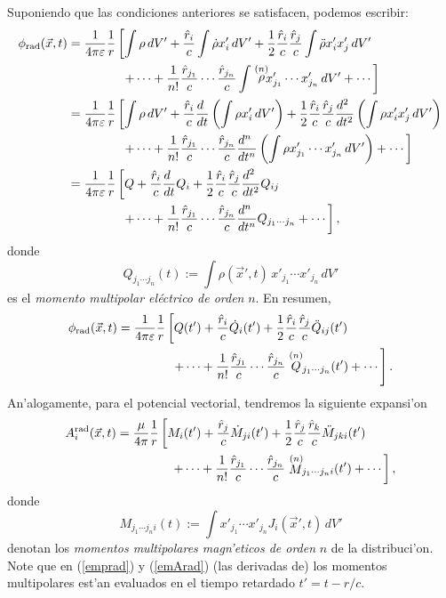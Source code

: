 Suponiendo que las condiciones anteriores se satisfacen, podemos escribir:
\begin{align}
\phi_{\rm rad}(\vec{x},t)
 &= \frac{1}{4\pi\varepsilon}\frac{1}{r}\left[  \int\rho\,dV'+\frac{\hat{r}_i}{c}\int\dot{\rho}x'_i\,dV'+\frac{1}{2}\frac{\hat{r}_i}{c}\frac{\hat{r}_j}{c}\int\ddot{\rho}x'_ix'_j\,dV'\right. \nonumber \\
 &\qquad\qquad\  \left.+\cdots +
\frac{1}{n!}\frac{\hat{r}_{j_1}}{c}\cdots\frac{\hat{r}_{j_n}}{c}\int\stackrel{(n)}{\rho}\!\!\!x'_{j_1}\cdots x'_{j_n}\,dV'+\cdots\right] \\
 &= \frac{1}{4\pi\varepsilon}\frac{1}{r}\left[  \int\rho\,dV'+\frac{\hat{r}_i}{c}\frac{d\ }{dt}\left(\int\rho x'_i\,dV'\right)+\frac{1}{2}\frac{\hat{r}_i}{c}\frac{\hat{r}_j}{c}\frac{d^2\ }{dt^2}\left(\int\rho x'_ix'_j\,dV'\right)\right. \nonumber \\
 &\qquad\qquad\ \left.+\cdots +
\frac{1}{n!}\frac{\hat{r}_{j_1}}{c}\cdots\frac{\hat{r}_{j_n}}{c}\frac{d^n\ }{dt^n}\left(\int\rho x'_{j_1}\cdots x'_{j_n}\,dV'\right) +\cdots\right] \\
 &= \frac{1}{4\pi\varepsilon}\frac{1}{r}\left[  Q+\frac{\hat{r}_i}{c}\frac{d\ }{dt}Q_i+\frac{1}{2}\frac{\hat{r}_i}{c}\frac{\hat{r}_j}{c}\frac{d^2\ }{dt^2}Q_{ij}\right. \nonumber \\
 &\qquad\qquad\ \left.+\cdots +\frac{1}{n!}\frac{\hat{r}_{j_1}}{c}\cdots\frac{\hat{r}_{j_n}}{c}\frac{d^n\ }{dt^n}Q_{j_1\cdots j_n} +\cdots\right] ,
\end{align}
donde
\begin{equation}
 Q_{j_1\cdots j_n}(t):=\int\rho(\vec{x}',t)\, x'_{j_1}\cdots x'_{j_n}\,dV'
\end{equation}
es el \textit{momento multipolar eléctrico de orden} $n$. En resumen,
\begin{align}
 \phi_{\rm rad}(\vec{x},t) &= \frac{1}{4\pi\varepsilon}\frac{1}{r}\left[  Q(t')+\frac{\hat{r}_i}{c}\dot{Q}_i(t')+\frac{1}{2}\frac{\hat{r}_i}{c}\frac{\hat{r}_j}{c}\ddot{Q}_{ij}(t') \right.\nonumber\\
& \qquad\qquad\ \left.+\cdots +\frac{1}{n!}\frac{\hat{r}_{j_1}}{c}\cdots\frac{\hat{r}_{j_n}}{c}\stackrel{(n)}{Q}\!\!{}_{j_1\cdots j_n}(t') +\cdots\right] .  \label{emprad}
\end{align}
An'alogamente, para el potencial vectorial, tendremos la siguiente expansi'on
\begin{align}
A_i^{\rm rad}(\vec{x},t) &= \frac{\mu}{4\pi}\frac{1}{r}\left[  M_i(t')+\frac{\hat{r}_j}{c}\dot{M}_{ji}(t')+\frac{1}{2}\frac{\hat{r}_j}{c}\frac{\hat{r}_k}{c}\ddot{M}_{jki}(t')\right.\nonumber\\
& \qquad\qquad\ \left.+\cdots +\frac{1}{n!}\frac{\hat{r}_{j_1}}{c}\cdots\frac{\hat{r}_{j_n}}{c}\stackrel{(n)}{M}\!\!{}_{j_1\cdots j_ni}(t') +\cdots\right] , \label{emArad}
\end{align}
donde
\begin{equation}
 M_{j_1\cdots j_ni}(t):=\int x'_{j_1}\cdots x'_{j_n}J_i(\vec{x}',t)\,dV'
\end{equation}
denotan los \textit{momentos multipolares magn'eticos de orden} $n$ de la distribuci'on. Note que en (\ref{emprad}) y (\ref{emArad}) (las derivadas de) los momentos multipolares est'an evaluados en el tiempo retardado $t'=t-r/c$.

